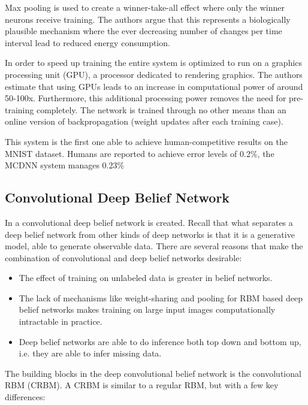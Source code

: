 \documentclass[11pt]{article}
\begin{document}
Max pooling is used to create a winner-take-all effect where only the winner neurons receive training.  The authors argue that this represents a biologically plausible mechanism where the ever decreasing number of changes per time interval lead to reduced energy consumption.

In order to speed up training the entire system is optimized to run on a graphics processing unit (GPU), a processor dedicated to rendering graphics. The authors estimate that using GPUs leads to an increase in computational power of around 50-100x.  Furthermore, this additional processing power removes the need for pre-training completely.  The network is trained through no other means than an online version of backpropagation (weight updates after each training case).

This system is the first one able to achieve human-competitive results on the MNIST dataset.  Humans are reported to achieve error levels of 0.2\%, the MCDNN system manages 0.23\%


\subsection{Convolutional Deep Belief Network}

In \cite{lee} a convolutional deep belief network is created.  Recall that what separates a deep belief network from other kinds of deep networks is that it is a generative model, able to generate observable data.  There are several reasons that make the combination of convolutional and deep belief networks desirable:
\begin{itemize}
 \item The effect of training on unlabeled data is greater in belief networks.
 \item The lack of mechanisms like weight-sharing and pooling for RBM based deep belief networks makes training on large input images computationally intractable in practice.
 \item Deep belief networks are able to do inference both top down and bottom up, i.e. they are able to infer missing data.
\end{itemize}

The building blocks in the deep convolutional belief network is the convolutional RBM (CRBM).  A CRBM is similar to a regular RBM, but with a few key differences:
\end{document}
